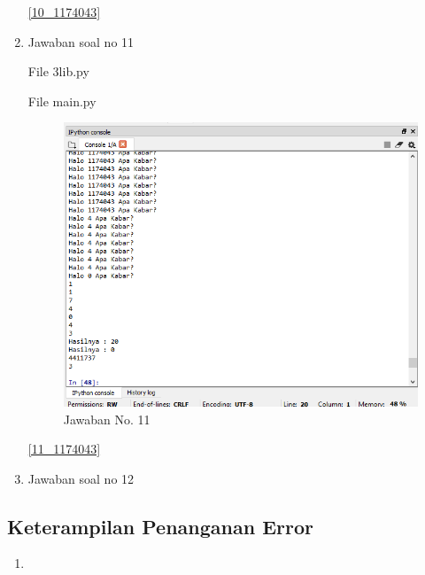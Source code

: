 \begin{enumerate}
				\ref{10_1174043}
				
			\item Jawaban soal no 11
			
				File 3lib.py
				
				
				File main.py
				
				
				\begin{figure} [ht]
					\centerline{\includegraphics[width=1\textwidth]{figures/chapter3/11_1174043.png}}
					\caption{Jawaban No. 11}
					\label{11}
				\end{figure}

				\ref{11_1174043}
				
			\item Jawaban soal no 12
			
		
		\end{enumerate}
		
		\subsection{Keterampilan Penanganan Error}
			\begin{enumerate}
				\item 
			
			\end{enumerate}
			

